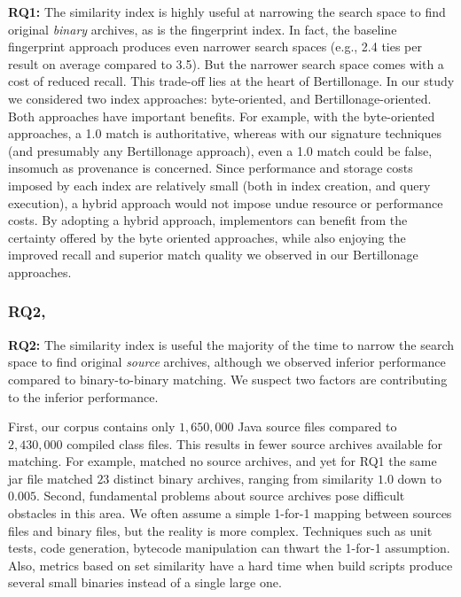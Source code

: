 \textbf{RQ1:}
The similarity index is highly useful at narrowing the search space to find
original \emph{binary} archives, as is the fingerprint index.  In fact, the
baseline fingerprint approach produces even narrower search spaces (e.g., 2.4 ties per
result on average compared to 3.5).  But the narrower search space comes
with a cost of reduced recall.  This trade-off lies at the heart of
Bertillonage.  In our study we considered two index approaches:
byte-oriented, and Bertillonage-oriented.  Both approaches have important
benefits.  For example, with the byte-oriented approaches, a 1.0 match is
authoritative, whereas with our signature techniques (and presumably any
Bertillonage approach), even a 1.0 match could be false, insomuch as
provenance is concerned.  Since performance and storage costs imposed by
each index are relatively small (both in index creation, and query
execution), a hybrid approach would not impose undue resource or performance costs.
By adopting a hybrid approach, implementors can benefit from the
certainty offered by the byte oriented approaches, while also enjoying the
improved recall and superior match quality we observed in our Bertillonage approaches.


\subsubsection{RQ2, \rqTwo}

\textbf{RQ2:}
The similarity index is useful the majority of the time to narrow the
search space to find original \emph{source} archives, although we observed
inferior performance compared to binary-to-binary matching.  We suspect two
factors are contributing to the inferior performance.


First, our corpus contains only $1,650,000$ Java source files
compared to $2,430,000$ compiled class files.  This results in fewer
source archives available for matching.  For example,
 matched no source archives, and yet for RQ1 the
same jar file matched $23$ distinct binary archives, ranging from
similarity $1.0$ down to $0.005$.  Second, fundamental problems about
source archives pose difficult obstacles in this area.  We often assume a
simple 1-for-1 mapping between sources files and binary files, but the
reality is more complex.  Techniques such as unit tests, code generation,
bytecode manipulation can thwart the 1-for-1 assumption.  Also, metrics
based on set similarity have a hard time when build scripts produce several
small binaries instead of a single large one.

